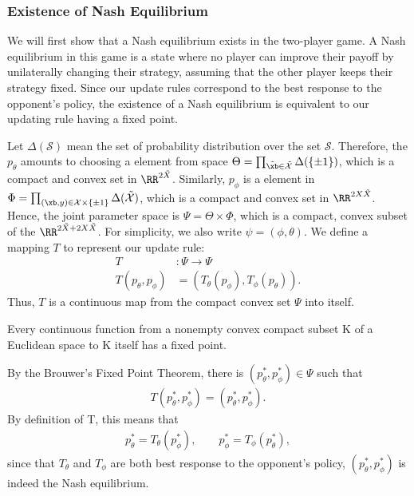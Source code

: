\subsubsection{Existence of Nash Equilibrium}
We will first show that a Nash equilibrium exists in the two-player game. A Nash equilibrium in this game is a state where no player can improve their payoff by unilaterally changing their strategy, assuming that the other player keeps their strategy fixed. Since our update rules correspond to the best response to the opponent’s policy, the existence of a Nash equilibrium is equivalent to our updating rule having a fixed point.

Let $\Delta(\mathcal{S})$ mean the set of probability distribution over the set $\mathcal{S}$. Therefore, the $p_\theta$ amounts to choosing a element from space
$\Theta = \prod_{\tilde \xb \in \tilde{\mathcal{X}}} \Delta(\{\pm 1\})$,
which is a compact and convex set in $\RR^{2 \tilde{X}}$. Similarly, $p_\phi$ is a element in 
$ \Phi = \prod_{(\xb,y) \in \mathcal{X} \times \{\pm1\}} \Delta(\tilde{\mathcal{X}})$,
which is a compact and convex set in $\RR^{2 X \tilde X}$. Hence, the joint parameter space is $\Psi = \Theta \times \Phi$, which is a compact, convex subset of the $\RR^{2 \tilde{X} +  2 X \tilde X}$. For simplicity, we also write $\psi = (\phi, \theta)$. We define a mapping $T$ to represent our update rule:
\begin{align*}
    T&: \Psi  \rightarrow \Psi \\
    T(p_\theta, p_\phi) & = (T_\theta(p_{\phi}), T_\phi(p_{\theta})).
\end{align*}
Thus, $T$ is a continuous map from the compact convex set $\Psi$ into itself.
\begin{theorem}
    Every continuous function from a nonempty convex compact subset K of a Euclidean space to K itself has a fixed point.
\end{theorem}
By the Brouwer's Fixed Point Theorem, there is $(p^*_{\theta}, p^*_{\phi}) \in \Psi$ such that
\begin{align*}
    T(p^*_{\theta}, p^*_{\phi}) = (p^*_{\theta}, p^*_{\phi}).
\end{align*}
By definition of T, this means that
\begin{align*}
    p^*_{\theta} = T_{\theta}(p^*_{\phi}), \qquad p^*_{\phi} = T_{\phi}(p^*_{\theta}),
\end{align*}
since that $T_\theta$ and $T_\phi$ are both best response to the opponent's policy, $(p^*_{\theta}, p^*_{\phi})$ is indeed the Nash equilibrium.

